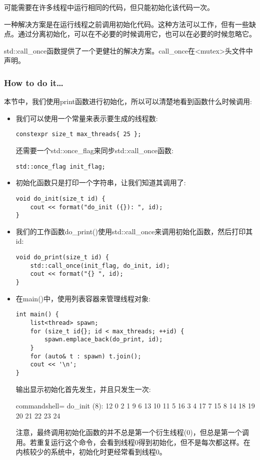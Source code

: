 
可能需要在许多线程中运行相同的代码，但只能初始化该代码一次。

一种解决方案是在运行线程之前调用初始化代码。这种方法可以工作，但有一些缺点。通过分离初始化，可以在不必要的时候调用它，也可以在必要的时候忽略它。

std::call\_once函数提供了一个更健壮的解决方案。call\_once在<mutex>头文件中声明。

\subsubsection{How to do it…}

本节中，我们使用print函数进行初始化，所以可以清楚地看到函数什么时候调用:

\begin{itemize}
\item 
我们可以使用一个常量来表示要生成的线程数:

\begin{lstlisting}[style=styleCXX]
constexpr size_t max_threads{ 25 };
\end{lstlisting}

还需要一个std::once\_flag来同步std::call\_once函数:

\begin{lstlisting}[style=styleCXX]
std::once_flag init_flag;
\end{lstlisting}

\item 
初始化函数只是打印一个字符串，让我们知道其调用了:

\begin{lstlisting}[style=styleCXX]
void do_init(size_t id) {
	cout << format("do_init ({}): ", id);
}
\end{lstlisting}

\item 
我们的工作函数do\_print()使用std::call\_once来调用初始化函数，然后打印其id:

\begin{lstlisting}[style=styleCXX]
void do_print(size_t id) {
	std::call_once(init_flag, do_init, id);
	cout << format("{} ", id);
}
\end{lstlisting}

\item 
在main()中，使用列表容器来管理线程对象:

\begin{lstlisting}[style=styleCXX]
int main() {
	list<thread> spawn;
	for (size_t id{}; id < max_threads; ++id) {
		spawn.emplace_back(do_print, id);
	}
	for (auto& t : spawn) t.join();
	cout << '\n';
}
\end{lstlisting}

输出显示初始化首先发生，并且只发生一次:

\begin{tcblisting}{commandshell={}}
do_init (8): 12 0 2 1 9 6 13 10 11 5 16 3 4 17 7 15 8 14
18 19 20 21 22 23 24
\end{tcblisting}

注意，最终调用初始化函数的并不总是第一个衍生线程(0)，但总是第一个调用。若重复运行这个命令，会看到线程0得到初始化，但不是每次都这样。在内核较少的系统中，初始化时更经常看到线程0。
\end{itemize}

